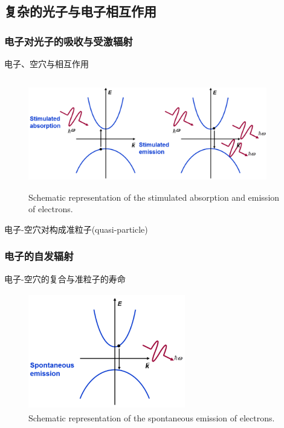 {\subsection{复杂的光子与电子相互作用}
\frame
{
	\frametitle{电子对光子的吸收与受激辐射}
电子、空穴与相互作用	
\begin{figure}[h!]
\centering
\vspace*{-0.2in}
\includegraphics[height=1.9in,width=4.1in,viewport=0 0 1500 600,clip]{Figures/Inter_band-transition_abs-emi.png}
\caption{\fontsize{5.2pt}{4.0pt}\selectfont\textrm{Schematic representation of the stimulated absorption and emission of electrons.}}%
\label{Stimulated-absorption-emission}
\end{figure} 
电子-空穴对构成准粒子\textrm{(quasi-particle)}
}

\frame
{
	\frametitle{电子的自发辐射}
	电子-空穴的复合与准粒子的寿命
\begin{figure}[h!]
\centering
\vspace*{-0.05in}
\includegraphics[height=2.0in,width=2.7in,viewport=0 0 830 620,clip]{Figures/Inter_band-transition_emission.png}
\caption{\fontsize{5.2pt}{4.0pt}\selectfont\textrm{Schematic representation of the spontaneous emission of electrons.}}%
\label{spontaneous-emission}
\end{figure} 
}

}
